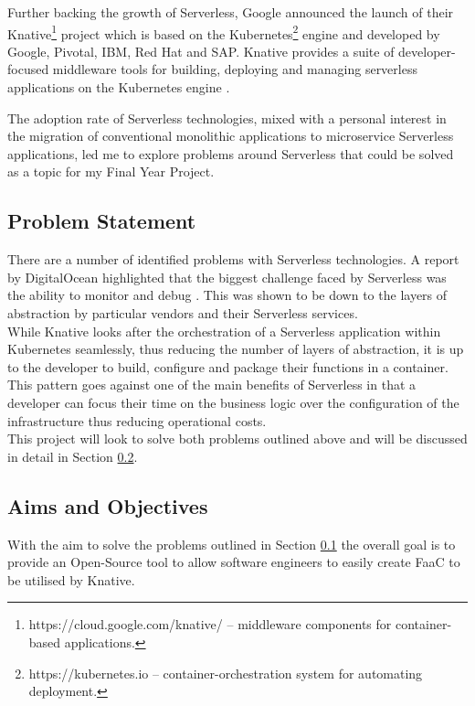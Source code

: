 Further backing the growth of \gls{Serverless}, Google announced the launch of their \gls{Knative}\footnote{https://cloud.google.com/knative/ -- middleware components for container-based applications.} project which is based on the \gls{Kubernetes}\footnote{https://kubernetes.io -- container-orchestration system for automating deployment.} engine and developed by Google, Pivotal, IBM, Red Hat and SAP. Knative provides a suite of developer-focused middleware tools for building, deploying and managing serverless applications on the \gls{Kubernetes} engine \citep{bryant_2018}.

The adoption rate of \gls{Serverless} technologies, mixed with a personal interest in the migration of conventional monolithic applications to microservice \gls{Serverless} applications, led me to explore problems around \gls{Serverless} that could be solved as a topic for my Final Year Project.

\subsection{Problem Statement}
\label{sub:problem}
 There are a number of identified problems with \gls{Serverless} technologies. A report by DigitalOcean highlighted that the biggest challenge faced by \gls{Serverless} was the ability to monitor and debug \citep{digitalocean_2018}. This was shown to be down to the layers of abstraction by particular vendors and their \gls{Serverless} services.
\\While \gls{Knative} looks after the orchestration of a \gls{Serverless} application within \gls{Kubernetes} seamlessly, thus reducing the number of layers of abstraction, it is up to the developer to build, configure and package their functions in a container. This pattern goes against one of the main benefits of \gls{Serverless} in that a developer can focus their time on the business logic over the configuration of the infrastructure thus reducing operational costs.
\\This project will look to solve both problems outlined above and will be discussed in detail in Section \ref{sub:aims}.

\subsection{Aims and Objectives}
\label{sub:aims}
With the aim to solve the problems outlined in Section \ref{sub:problem} the overall goal is to provide an \gls{Open-Source} tool to allow software engineers to easily create \gls{FaaC} to be utilised by \gls{Knative}. 


